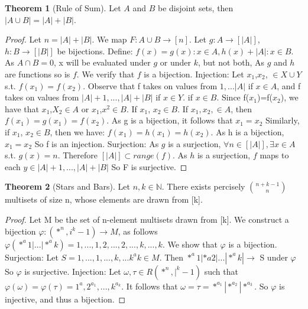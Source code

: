 \documentclass{article}
\theoremstyle{definition}
\newtheorem{theorem}{Theorem}[section]
\begin{document}
\begin{theorem}[Rule of Sum]
Let $A$ and $B$ be disjoint sets, then $|A \cup B|=|A|+|B|$.
\end{theorem}
\begin{proof}
Let $n=|A|+|B|$. We map $F: A \cup B \rightarrow [n]$. Let $g: A \rightarrow [|A|]$, $h:B \rightarrow [|B|]$ be bijections. Define: $f(x)={g(x): x \in A, h(x)+|A|:x\in B}$. As $A \cap B=0$, x will be evaluated under $g$ or under $k$, but not both, As $g$ and $h$ are functions so is $f$. We verify that $f$ is a bijection. Injection: Let $x_1$,$x_2$, $\in X\cup Y$ s.t. $f(x_1)=f(x_2)$. Observe that f takes on values from ${1,...|A|}$ if $x \in A$, and f takes on values from ${|A|+1,...,|A|+|B|}$ if $x \in Y$. if $x \in B$. Since f($x_1$)=f($x_2$), we have that $x_1$,$X_2 \in A$ or $x_1$,$x^2 \in B$. If $x_1$, $x_2 \in B$. If $x_1, x_2, \in A$, then $f(x_1)=g(x_1)=f(x_2)$. As g is a bijection, it follows that $x_1=x_2$ Similarly, if $x_1$, $x_2 \in B$, then we have: $f(x_1)=h(x_1)=h(x_2)$. As h is a bijection, $x_1= x_2$ So f is an injection. Surjection: As $g$ is a surjection, $\forall n \in [|A|], \exists x \in A$ s.t. $g(x)=n$. Therefore $[|A|]\subset range(f)$. As $h$ is a surjection, $f$ maps to each $y \in {|A|+1,...,|A|+|B|}$ So F is surjective.
\end{proof}

\begin{theorem}[Stars and Bars]
Let $n,k\in \mathbb{N}$. There exists percisely ${n+k-1 \choose n}$ multisets of size n, whose elements are drawn from [k].
\end{theorem}
\begin{proof}
Let M be the set of n-element multisets drawn from [k]. We construct a bijection $\varphi:(*^n,i^k-1) \rightarrow M$, as follows $\varphi (*^a1|...|*^ak) = {1,...,1,2,...,2,...,k,...,k}$. We show that $\varphi$ is a bijection. 
Surjection: Let $S = {1,...,1,...,k,...k^ak} \in M$. Then $*^a1|*a2|...|*^ak| \rightarrow$ S under $\varphi$ So $\varphi$ is surjective. Injection: Let $\omega, \tau \in R(*^n,|^k-1)$ such that $\varphi(\omega) =  \varphi(\tau)= {1^a,2^{a_{1}},...,k^{a_{k}}}$. It follows that $\omega = \tau = *^{a_{1}}|*^{a_{2}}|*^{a_{3}}$. So $\varphi$ is injective, and thus a bijection.
\end{proof}
\end{document}
